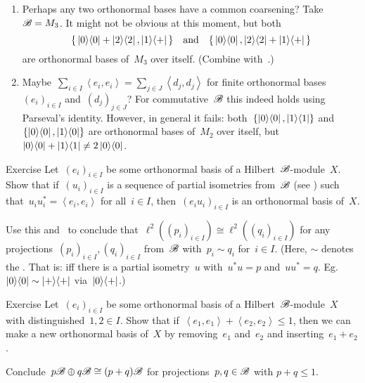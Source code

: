 \begin{parsec}
\begin{point}
\begin{enumerate}
\item
Perhaps any two orthonormal bases have a common coarsening?
Take~$\mathscr{B} = M_3$.
It might not be obvious at this moment, but both
\begin{equation*}
    \{\,\left|0\right>\!\left<0\right| + \left|2\right>\!\left<2\right|, \left|1\right>\!\left<+\right|\,\}
    \quad \text{and} \quad
    \{\,\left|0\right>\!\left<0\right|, \left|2\right>\!\left<2\right|+ \left|1\right>\!\left<+\right|\,\}
\end{equation*}
are orthonormal bases of~$M_3$ over itself.
(Combine  with~.)

\item
Maybe~$\sum_{i\in I} \left<e_i,e_i\right> = \sum_{j\in J} \left<d_j,d_j\right>$
    for finite orthonormal bases~$(e_i)_{i \in I}$ and~$(d_j)_{j \in J}$?
For commutative~$\mathscr{B}$ this indeed holds using Parseval's identity.
However, in general it fails:
        both~$\{\left|0\right>\!\left<0\right|, \left|1\right>\!\left<1\right|\}$ and
        $\{\left|0\right>\!\left<0\right|, \left|1\right>\!\left<0\right| \}$
        are orthonormal bases of~$M_2$ over itself,
    but~$\left|0\right>\!\left<0\right|+ \left|1\right>\!\left<1\right| \neq 2 \left|0\right>\!\left<0\right|$.
\end{enumerate}
\end{point}
\begin{point}[onb1]{Exercise}%
Let~$(e_i)_{ i \in I}$ be some orthonormal basis of a Hilbert~$\mathscr{B}$-module~$X$.
Show that if~$(u_i)_{i \in I}$
    is a sequence of partial isometries
    from~$\mathscr{B}$
    (see )
    such that~$u_iu_i^* = \left<e_i,e_i\right>$
    for all~$i \in I$,
    then~$(e_iu_i)_{i \in I}$
    is an orthonormal basis of~$X$.

Use this and~ to conclude
    that~$\ell^2((p_i)_{i \in I}) \cong \ell^2((q_i)_{i \in I})$
    for any projections~$(p_i)_{i\in I}, (q_i)_{i\in I} $
    from~$\mathscr{B}$
    with~$p_i \sim q_i$ for~$i \in I$.
    (Here, $\sim$ denotes the .
    That is:  iff there is a partial isometry~$u$
    with~$u^*u = p$ and~$uu^*=q$.
    Eg.~$\left|0\right>\!\left<0\right| \sim \left|+\right>\!\left<+\right|$
        via~$\left|0\right>\!\left<+\right|$.)
\end{point}

\begin{point}[onb2]{Exercise}%
Let~$(e_i)_{ i \in I}$ be some orthonormal basis of a Hilbert~$\mathscr{B}$-module~$X$
    with distinguished~$1,2 \in I$.
Show that if~$\left<e_1,e_1\right> + \left<e_2,e_2\right> \leq 1$,
    then we can make a new orthonormal basis of~$X$ by  removing~$e_1$ and~$e_2$
        and inserting~$e_1 + e_2$.

Conclude~$p \mathscr{B} \oplus q \mathscr{B} \cong (p+q) \mathscr{B}$
    for projections~$p,q \in \mathscr{B}$ with $p+q \leq 1$.
\end{point}
\end{parsec}
